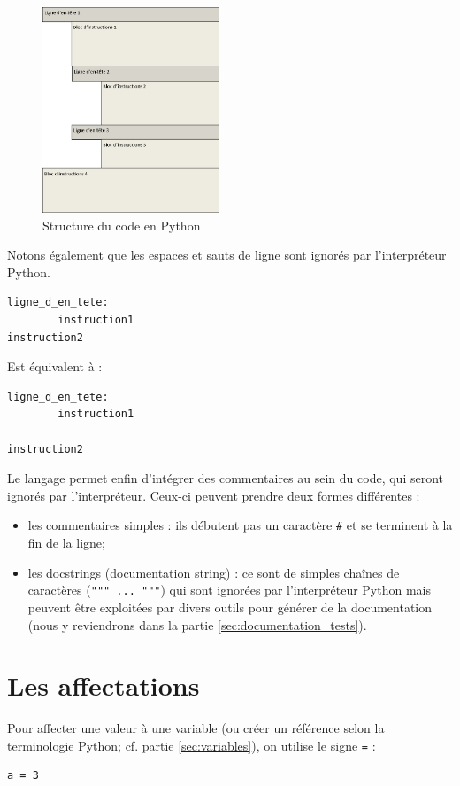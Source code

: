 \documentclass[12pt, a4paper]{article}
\begin{document}
\begin{figure}[H]
	\center \includegraphics[width=200px]{img/structure_code_python.png}
	\caption{Structure du code en Python}
	\label{img:structure_code}
\end{figure}
	
	
Notons également que les espaces et sauts de ligne sont ignorés par l'interpréteur Python.
\begin{lstlisting}
ligne_d_en_tete:
		instruction1
instruction2
\end{lstlisting}

Est équivalent à :
\begin{lstlisting}
ligne_d_en_tete:
		instruction1
	
instruction2
\end{lstlisting}

Le langage permet enfin d'intégrer des commentaires au sein du code, qui seront ignorés par l'interpréteur. Ceux-ci peuvent prendre deux formes différentes :
\begin{itemize}
	\item les commentaires simples : ils débutent pas un caractère \lstinline{#} et se terminent à la fin de la ligne;
	\item les docstrings (documentation string) : ce sont de simples chaînes de caractères (\lstinline{""" ... """}) qui sont ignorées par l'interpréteur Python mais peuvent être exploitées par divers outils pour générer de la documentation (nous y reviendrons dans la partie \ref{sec:documentation_tests}).
\end{itemize}



\section{Les affectations}
Pour affecter une valeur à une variable (ou créer un référence selon la terminologie Python; cf. partie \ref{sec:variables}), on utilise le signe \lstinline{=} :
\begin{lstlisting}
a = 3
\end{lstlisting}
\end{document}
